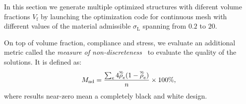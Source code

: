 \begin{figure}[]
    \bigskip
    \hfill
    \hfill
    \hfill
    \caption{}
    \label{fig:03_to_sol}
\end{figure}
In this section we generate multiple optimized structures with diferent volume fractions $V_\text{f}$ by launching the optimization code for continuous mesh with different values of the material admissible $\sigma_\text{L}$ spanning from $0.2$ to $20$.

On top of volume fraction, compliance and stress, we evaluate an additional metric  called the \textit{measure of non-discreteness}~ to evaluate the quality of the solutions. It is defined as:
\begin{equation}
    M_\text{nd} = \frac{\sum_e 4 \overline{\widetilde{\rho}}_e(1-\overline{\widetilde{\rho}}_e)}{n} \times 100 \%,
\end{equation}
where results near-zero mean a completely black and white design. 

